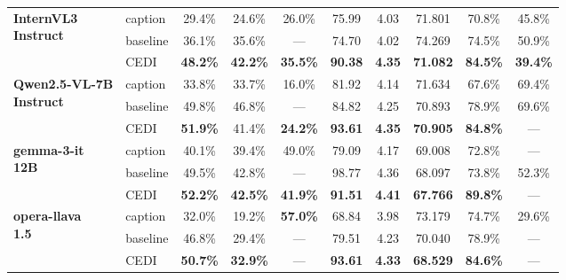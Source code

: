 \begin{table}[t]
\begin{tabular}{@{}l|l|cccccccc@{}}
\multirow{3}{*}{\parbox{2.5cm}{\centering\textbf{InternVL3}\\ \textbf{Instruct}}} & caption & 29.4\% & 24.6\% & 26.0\% & 75.99 & 4.03 & 71.801 & 70.8\% & 45.8\% \\
 & baseline & 36.1\% & 35.6\% & --- & 74.70 &  4.02 & 74.269 & 74.5\% & 50.9\% \\
\rowcolor[HTML]{E6F2FF}
 \multicolumn{1}{l}{\cellcolor[HTML]{E6F2FF}} & CEDI & \textbf{48.2\%} & \textbf{42.2\%} & \textbf{35.5\%} & \textbf{90.38} & \textbf{4.35} & \textbf{71.082} & \textbf{84.5\%} & \textbf{39.4\%} \\
\midrule

\multirow{3}{*}{\parbox{2.5cm}{\centering\textbf{Qwen2.5-VL-7B}\\ \textbf{Instruct}}} & caption & 33.8\% & 33.7\% & 16.0\% & 81.92 & 4.14 & 71.634 & 67.6\% & 69.4\% \\
 & baseline & 49.8\% & 46.8\% & --- & 84.82 &  4.25 & 70.893 & 78.9\% & 69.6\% \\
\rowcolor[HTML]{E6F2FF}
 \multicolumn{1}{l}{\cellcolor[HTML]{E6F2FF}} & CEDI & \textbf{51.9\%} & 41.4\% & \textbf{24.2\%} & \textbf{93.61} & \textbf{4.35} & \textbf{70.905} & \textbf{84.8\%} & --- \\
\midrule

\multirow{3}{*}{\parbox{2.5cm}{\centering\textbf{gemma-3-it}\\ \textbf{12B}}} & caption & 40.1\% & 39.4\% & 49.0\% & 79.09 & 4.17 & 69.008 & 72.8\% & --- \\
 & baseline & 49.5\% & 42.8\% & --- & 98.77 &  4.36 & 68.097 & 73.8\% & 52.3\% \\
\rowcolor[HTML]{E6F2FF}
 \multicolumn{1}{l}{\cellcolor[HTML]{E6F2FF}} & CEDI & \textbf{52.2\%} & \textbf{42.5\%} & \textbf{41.9\%} & \textbf{91.51} & \textbf{4.41} & \textbf{67.766} & \textbf{89.8\%} & --- \\
\midrule

\multirow{3}{*}{\parbox{2.5cm}{\centering\textbf{opera-llava}\\ \textbf{1.5}}} & caption & 32.0\% & 19.2\% & \textbf{57.0\%} & 68.84 &  3.98 & 73.179 & 74.7\% & 29.6\% \\
 & baseline & 46.8\% & 29.4\% & --- & 79.51 & 4.23 & 70.040 & 78.9\% & --- \\
\rowcolor[HTML]{E6F2FF}
 \multicolumn{1}{l}{\cellcolor[HTML]{E6F2FF}} & CEDI & \textbf{50.7\%} & \textbf{32.9\%} & --- & \textbf{93.61} & \textbf{4.33} & \textbf{68.529} & \textbf{84.6\%} & --- \\
\midrule


\end{tabular}
\end{table}
